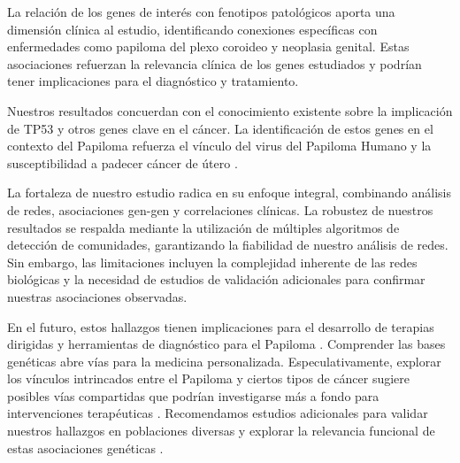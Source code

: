 \vspace{3pt}

La relación de los genes de interés con fenotipos patológicos aporta una dimensión clínica al estudio, identificando conexiones específicas con enfermedades como papiloma del plexo coroideo y neoplasia genital. Estas asociaciones refuerzan la relevancia clínica de los genes estudiados y podrían tener implicaciones para el diagnóstico y tratamiento.

\vspace{3pt}

Nuestros resultados concuerdan con el conocimiento existente sobre la implicación de TP53 y otros genes clave en el cáncer. La identificación de estos genes en el contexto del Papiloma refuerza el vínculo del virus del Papiloma Humano y la susceptibilidad a padecer cáncer de útero \cite{Kozomara2007}.

\vspace{3pt}

La fortaleza de nuestro estudio radica en su enfoque integral, combinando análisis de redes, asociaciones gen-gen y correlaciones clínicas. La robustez de nuestros resultados se respalda mediante la utilización de múltiples algoritmos de detección de comunidades, garantizando la fiabilidad de nuestro análisis de redes. Sin embargo, las limitaciones incluyen la complejidad inherente de las redes biológicas y la necesidad de estudios de validación adicionales para confirmar nuestras asociaciones observadas.

\vspace{3pt}

En el futuro, estos hallazgos tienen implicaciones para el desarrollo de terapias dirigidas y herramientas de diagnóstico para el Papiloma \cite{Kechagias2022}. Comprender las bases genéticas abre vías para la medicina personalizada. Especulativamente, explorar los vínculos intrincados entre el Papiloma y ciertos tipos de cáncer sugiere posibles vías compartidas que podrían investigarse más a fondo para intervenciones terapéuticas \cite{Sofiani2023}. Recomendamos estudios adicionales para validar nuestros hallazgos en poblaciones diversas y explorar la relevancia funcional de estas asociaciones genéticas \cite{solomon2018head}\cite{dongre2023tp53}. 
